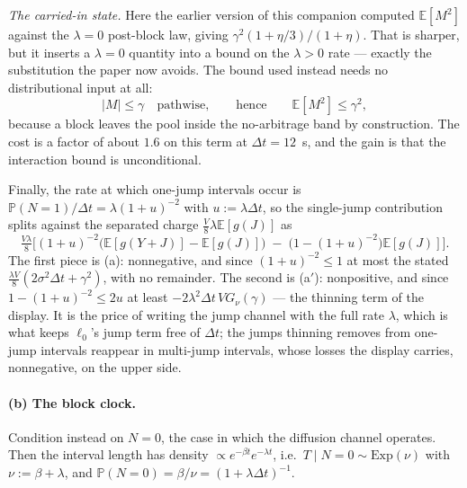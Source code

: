 \documentclass[11pt]{article}
\theoremstyle{definition}
\theoremstyle{remark}
\newcommand{\E}{\mathbb{E}}
\newcommand{\Prob}{\mathbb{P}}
\newcommand{\dt}{\Delta t}
\newcommand{\1}{\mathbf{1}}
\begin{document}
\emph{The carried-in state.} Here the earlier version of this companion computed $\E[M^2]$ against the $\lambda=0$ post-block law, giving $\gamma^2(1+\eta/3)/(1+\eta)$. That is sharper, but it inserts a $\lambda=0$ quantity into a bound on the $\lambda>0$ rate --- exactly the substitution the paper now avoids. The bound used instead needs no distributional input at all:
\[
|M| \le \gamma \quad\text{pathwise}, \qquad\text{hence}\qquad \E[M^2] \le \gamma^2,
\]
because a block leaves the pool inside the no-arbitrage band by construction. The cost is a factor of about $1.6$ on this term at $\dt=12$~s, and the gain is that the interaction bound is unconditional.

Finally, the rate at which one-jump intervals occur is $\Prob(N{=}1)/\dt = \lambda(1+u)^{-2}$ with $u:=\lambda\dt$, so the single-jump contribution splits against the separated charge $\tfrac{V}{8}\lambda\E[g(J)]$ as
\[
\tfrac{V\lambda}{8}\Big[(1+u)^{-2}\big(\E[g(Y{+}J)]-\E[g(J)]\big) \;-\; \big(1-(1+u)^{-2}\big)\E[g(J)]\Big].
\]
The first piece is (a): nonnegative, and since $(1+u)^{-2}\le1$ at most the stated $\tfrac{\lambda V}{8}(2\sigma^2\dt+\gamma^2)$, with no remainder. The second is (a$'$): nonpositive, and since $1-(1+u)^{-2}\le2u$ at least $-2\lambda^2\dt\,VG_\nu(\gamma)$ --- the thinning term of the display. It is the price of writing the jump channel with the full rate $\lambda$, which is what keeps $\ell_0$'s jump term free of $\dt$; the jumps thinning removes from one-jump intervals reappear in multi-jump intervals, whose losses the display carries, nonnegative, on the upper side.

\paragraph{(b) The block clock.}
Condition instead on $N = 0$, the case in which the diffusion channel operates. Then the interval length has density $\propto e^{-\beta t}e^{-\lambda t}$, i.e.\ $T\mid N{=}0 \sim \mathrm{Exp}(\nu)$ with $\nu := \beta + \lambda$, and $\Prob(N{=}0) = \beta/\nu = (1+\lambda\dt)^{-1}$.
\end{document}
